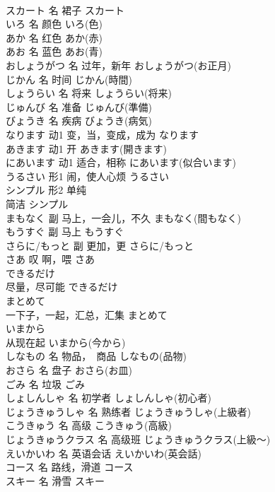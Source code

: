 \documentclass[8pt]{extreport}
\begin{document}
\begin{CJK}{UTF8}{min}
\\	スカート	名	裙子	スカート	
\\	いろ	名	颜色	いろ(色)	
\\	あか	名	红色	あか(赤)	
\\	あお	名	蓝色	あお(青)	
\\	おしょうがつ	名	过年，新年	おしょうがつ(お正月)	
\\	じかん	名	时间	じかん(時間)	
\\	しょうらい	名	将来	しょうらい(将来)	
\\	じゅんび	名	准备	じゅんび(準備)	
\\	びょうき	名	疾病	びょうき(病気)	
\\	なります	动1	变，当，变成，成为	なります	
\\	あきます	动1	开	あきます(開きます)	
\\	にあいます	动1	适合，相称	にあいます(似合います)	
\\	うるさい	形1	闹，使人心烦	うるさい	
\\	シンプル	形2	单纯　
\\	简洁	シンプル	
\\	まもなく	副	马上，一会儿，不久	まもなく(間もなく)	
\\	もうすぐ	副	马上	もうすぐ	
\\	さらに/もっと	副	更加，更	さらに/もっと	
\\	さあ	叹	啊，喂	さあ	
\\	できるだけ	
\\	尽量，尽可能	できるだけ	
\\	まとめて	
\\	一下子，一起，汇总，汇集	まとめて	
\\	いまから	
\\	从现在起	いまから(今から)	
\\	しなもの	名	物品，　商品	しなもの(品物)	
\\	おさら	名	盘子	おさら(お皿)	
\\	ごみ	名	垃圾	ごみ	
\\	しょしんしゃ	名	初学者	しょしんしゃ(初心者)	
\\	じょうきゅうしゃ	名	熟练者	じょうきゅうしゃ(上級者)	
\\	こうきゅう	名	高级	こうきゅう(高級)	
\\	じょうきゅうクラス	名	高级班	じょうきゅうクラス(上級～)	
\\	えいかいわ	名	英语会话	えいかいわ(英会話)	
\\	コース	名	路线，滑道	コース	
\\	スキー	名	滑雪	スキー	

\end{CJK}
\end{document}
